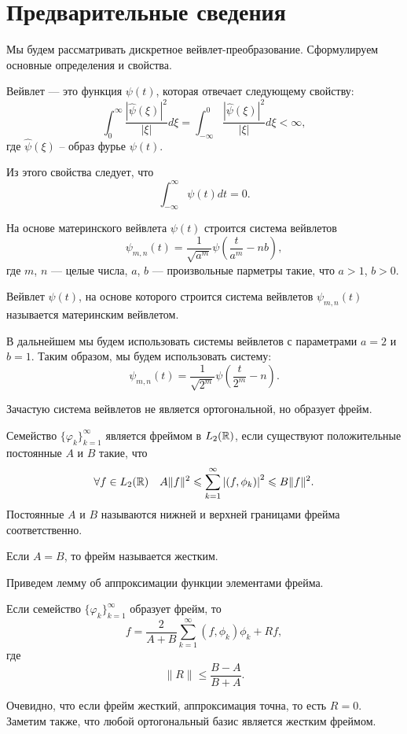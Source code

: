 \documentclass[../paper.tex]{subfiles}
\begin{document}
\section{Предварительные сведения}
Мы будем рассматривать дискретное вейвлет-преобразование. Сформулируем основные определения и свойства.
\begin{Def}
	Вейвлет --- это функция $\psi(t)$, которая отвечает следующему свойству:
	\[
		\int_0^\infty \frac{ \left|\hat{\psi}(\xi)\right|^2 }{\left|\xi\right|} d \xi
		= \int_{-\infty}^0 \frac{ \left|\hat{\psi}(\xi)\right|^2 }{\left|\xi\right|} d \xi
		< \infty
	,\] где $\hat{\psi}(\xi)$ -- образ фурье $\psi(t)$.
\end{Def}

Из этого свойства следует, что
\[
	\int_{-\infty}^{\infty} \psi(t) dt = 0
.\]

На основе материнского вейвлета $\psi(t)$ строится система вейвлетов
\[
	\psi_{m,n}(t) = \frac{1}{\sqrt{a^m}} \psi\left(\frac{t}{a^m} - n b\right)
,\]
где $m$, $n$ --- целые числа, $a$, $b$ --- произвольные парметры такие, что $a > 1$, $b > 0$.

Вейвлет $\psi(t)$, на основе которого строится система вейвлетов $\psi_{m,n}(t)$ называется материнским вейвлетом.

В дальнейшем мы будем использовать системы вейвлетов с параметрами $a=2$ и $b=1$.
Таким образом, мы будем использовать систему:
\[
	\psi_{m,n}(t) = \frac{1}{\sqrt{2^m}} \psi\left(\frac{t}{2^m} - n\right)
.\]

Зачастую система вейвлетов не является ортогональной, но образует фрейм.
\begin{Def}
	Семейство $\{\varphi_k\}_{k=1}^\infty$ является фреймом в $L_2(\mathbb{R})$, если существуют положительные постоянные $A$ и $B$ такие, что
	\[
		\forall f \in L_2(\mathbb{R}) \quad A \|f\|^2 \leqslant \sum_{k=1}^\infty \left|\left(f, \phi_k\right)\right|^2 \leqslant B \|f\|^2
	.\]
	Постоянные $A$ и $B$ называются нижней и верхней границами фрейма соответственно.

	Если $A = B$, то фрейм называется жестким.
\end{Def}

Приведем лемму об аппроксимации функции элементами фрейма.
\begin{Lem*}
	Если семейство $\{\varphi_k\}_{k=1}^\infty$ образует фрейм, то
	\[
		f = \frac{2}{A+B} \sum_{k=1}^\infty \left(f, \phi_k\right)\phi_k + Rf
	,\] где \[
		\|R\| \leqslant \frac{B-A}{B+A}
	.\]
\end{Lem*}
Очевидно, что если фрейм жесткий, аппроксимация точна, то есть $R = 0$.
Заметим также, что любой ортогональный базис является жестким фреймом.
\end{document}
